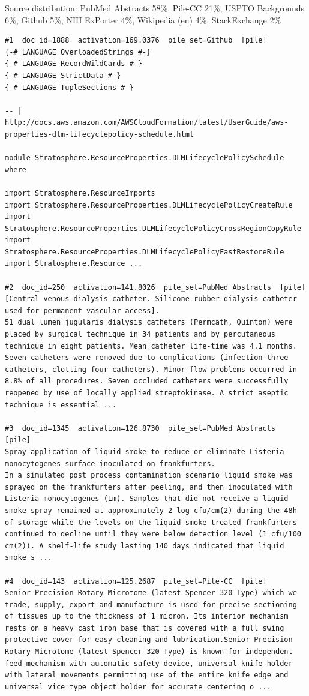 Source distribution: PubMed Abstracts 58\%, Pile-CC 21\%, USPTO Backgrounds 6\%, Github 5\%, NIH ExPorter 4\%, Wikipedia (en) 4\%, StackExchange 2\%

\begin{verbatim}
#1  doc_id=1888  activation=169.0376  pile_set=Github  [pile]
{-# LANGUAGE OverloadedStrings #-}
{-# LANGUAGE RecordWildCards #-}
{-# LANGUAGE StrictData #-}
{-# LANGUAGE TupleSections #-}

-- | http://docs.aws.amazon.com/AWSCloudFormation/latest/UserGuide/aws-properties-dlm-lifecyclepolicy-schedule.html

module Stratosphere.ResourceProperties.DLMLifecyclePolicySchedule where

import Stratosphere.ResourceImports
import Stratosphere.ResourceProperties.DLMLifecyclePolicyCreateRule
import Stratosphere.ResourceProperties.DLMLifecyclePolicyCrossRegionCopyRule
import Stratosphere.ResourceProperties.DLMLifecyclePolicyFastRestoreRule
import Stratosphere.Resource ...

#2  doc_id=250  activation=141.8026  pile_set=PubMed Abstracts  [pile]
[Central venous dialysis catheter. Silicone rubber dialysis catheter used for permanent vascular access].
51 dual lumen jugularis dialysis catheters (Permcath, Quinton) were placed by surgical technique in 34 patients and by percutaneous technique in eight patients. Mean catheter life-time was 4.1 months. Seven catheters were removed due to complications (infection three catheters, clotting four catheters). Minor flow problems occurred in 8.8% of all procedures. Seven occluded catheters were successfully reopened by use of locally applied streptokinase. A strict aseptic technique is essential ...

#3  doc_id=1345  activation=126.8730  pile_set=PubMed Abstracts  [pile]
Spray application of liquid smoke to reduce or eliminate Listeria monocytogenes surface inoculated on frankfurters.
In a simulated post process contamination scenario liquid smoke was sprayed on the frankfurters after peeling, and then inoculated with Listeria monocytogenes (Lm). Samples that did not receive a liquid smoke spray remained at approximately 2 log cfu/cm(2) during the 48h of storage while the levels on the liquid smoke treated frankfurters continued to decline until they were below detection level (1 cfu/100 cm(2)). A shelf-life study lasting 140 days indicated that liquid smoke s ...

#4  doc_id=143  activation=125.2687  pile_set=Pile-CC  [pile]
Senior Precision Rotary Microtome (latest Spencer 320 Type) which we trade, supply, export and manufacture is used for precise sectioning of tissues up to the thickness of 1 micron. Its interior mechanism rests on a heavy cast iron base that is covered with a full swing protective cover for easy cleaning and lubrication.Senior Precision Rotary Microtome (latest Spencer 320 Type) is known for independent feed mechanism with automatic safety device, universal knife holder with lateral movements permitting use of the entire knife edge and universal vice type object holder for accurate centering o ...


\end{verbatim}
